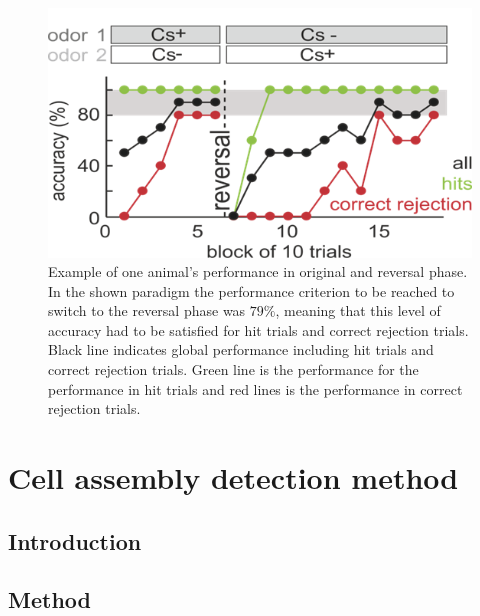 \begin{figure}
    \centering
\includegraphics[scale=1]{figures/Performance.png}
\caption{Example of one animal's performance in original and reversal phase. In the shown paradigm the performance criterion to be reached to switch to the reversal phase was $79\%$, meaning that this level of accuracy had to be satisfied for hit trials and correct rejection trials. Black line indicates global performance including hit trials and correct rejection trials. Green line is the performance for the performance in hit trials and red lines is the performance in correct rejection trials.}
\label{fig:performance}
\end{figure}
\section{Cell assembly detection method}
\label{chap:AssemblyMethod}
\subsection{Introduction}
\subsection{Method}